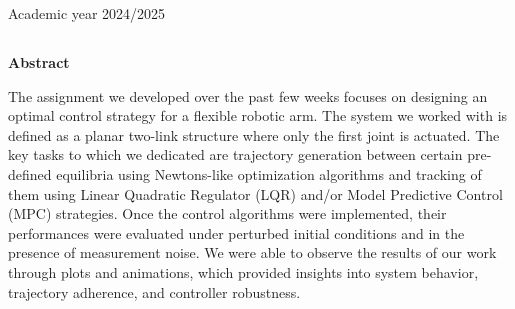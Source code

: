 \documentclass[a4paper,11pt,oneside]{book}
\begin{document}
\begin{center}
\vfill
      {\large Academic year \@2024/2025} \\
\end{center}



\newpage
\thispagestyle{empty}

\begin{center}
\chapter*{}
{\Huge \textbf{Abstract}}\\
\vspace{15mm}
\end{center}
\begin{justify}
    The assignment we developed over the past few weeks focuses on designing an optimal control strategy for a flexible robotic arm. The system we worked with is defined as a planar two-link structure where only the first joint is actuated. The key tasks to which we dedicated are trajectory generation between certain pre-defined equilibria using Newton\textquotesingle s-like optimization algorithms and tracking of them using Linear Quadratic Regulator (LQR) and/or Model Predictive Control (MPC) strategies. Once the control algorithms were implemented, their performances were evaluated under perturbed initial conditions and in the presence of measurement noise. We were able to observe the results of our work through plots and animations, which provided insights into system behavior, trajectory adherence, and controller robustness.
\end{justify}

\tableofcontents \thispagestyle{empty}

\end{document}

